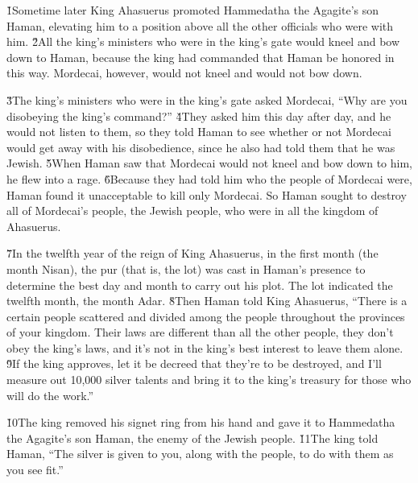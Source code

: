 \v{1}Sometime later King Ahasuerus promoted Hammedatha the Agagite's son Haman, elevating him to a position above all the other officials who were with him. \v{2}All the king's ministers who were in the king's gate would kneel and bow down to Haman, because the king had commanded that Haman be honored in this way. Mordecai, however, would not kneel and would not bow down.

\v{3}The king's ministers who were in the king's gate asked Mordecai, ``Why are you disobeying the king's command?'' \v{4}They asked him this day after day, and he would not listen to them, so they told Haman to see whether or not Mordecai would get away with his disobedience, since he also had told them that he was Jewish. \v{5}When Haman saw that Mordecai would not kneel and bow down to him, he flew into a rage. \v{6}Because they had told him who the people of Mordecai were, Haman found it unacceptable to kill only Mordecai. So Haman sought to destroy all of Mordecai's people, the Jewish people, who were in all the kingdom of Ahasuerus.

\v{7}In the twelfth year of the reign of King Ahasuerus, in the first month (the month Nisan), the pur (that is, the lot) was cast in Haman's presence to determine the best day and month to carry out his plot. The lot indicated the twelfth month, the month Adar. \v{8}Then Haman told King Ahasuerus, ``There is a certain people scattered and divided among the people throughout the provinces of your kingdom. Their laws are different than all the other people, they don't obey the king's laws, and it's not in the king's best interest to leave them alone. \v{9}If the king approves, let it be decreed that they're to be destroyed, and I'll measure out 10,000 silver talents and bring it to the king's treasury for those who will do the work.''

\v{10}The king removed his signet ring from his hand and gave it to Hammedatha the Agagite's son Haman, the enemy of the Jewish people. \v{11}The king told Haman, ``The silver is given to you, along with the people, to do with them as you see fit.''

